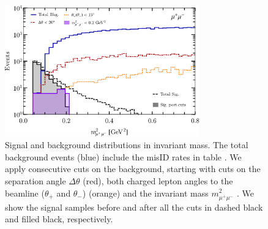 \begin{figure}[t]
\centering
\includegraphics[width = 0.75\textwidth]{figs/SigvsBkg.pdf}
 \caption{Signal and background distributions in invariant mass. The total background events (blue) include the misID rates in table . We apply consecutive cuts on the background, starting with cuts on the separation angle $\Delta \theta$ (red), both charged lepton angles to the beamline ($\theta_+$ and $\theta_-$) (orange) and the invariant mass $m^2_{\mu^+ \mu^-}$ . We show the signal samples before and after all the cuts in dashed black and filled black, respectively. \label{fig:bkg_flow}}
\end{figure}
%
